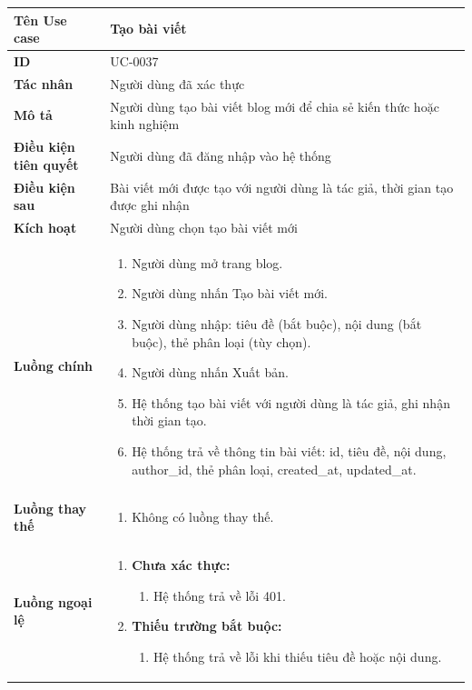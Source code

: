{
\renewcommand{\arraystretch}{1.5}

\begin{tabularx}{\textwidth}{|>{\raggedright\arraybackslash}X|>{\raggedright\arraybackslash}X|}
\hline
\textbf{Tên Use case} & Tạo bài viết \\
\hline
\textbf{ID} & UC-0037 \\
\hline
\textbf{Tác nhân} & Người dùng đã xác thực \\
\hline
\textbf{Mô tả} & Người dùng tạo bài viết blog mới để chia sẻ kiến thức hoặc kinh nghiệm \\
\hline
\textbf{Điều kiện tiên quyết} & Người dùng đã đăng nhập vào hệ thống \\
\hline
\textbf{Điều kiện sau} & Bài viết mới được tạo với người dùng là tác giả, thời gian tạo được ghi nhận \\
\hline
\textbf{Kích hoạt} & Người dùng chọn tạo bài viết mới \\
\hline
\textbf{Luồng chính} &
\begin{enumerate}
    \item Người dùng mở trang blog.
    \item Người dùng nhấn Tạo bài viết mới.
    \item Người dùng nhập: tiêu đề (bắt buộc), nội dung (bắt buộc), thẻ phân loại (tùy chọn).
    \item Người dùng nhấn Xuất bản.
    \item Hệ thống tạo bài viết với người dùng là tác giả, ghi nhận thời gian tạo.
    \item Hệ thống trả về thông tin bài viết: id, tiêu đề, nội dung, author\_id, thẻ phân loại, created\_at, updated\_at.
\end{enumerate} \\
\hline
\textbf{Luồng thay thế} &
\begin{enumerate}
    \item Không có luồng thay thế.
\end{enumerate} \\
\hline
\textbf{Luồng ngoại lệ} &
\begin{enumerate}
    \item \textbf{Chưa xác thực:}
    \begin{enumerate}
        \item[2Err.] Hệ thống trả về lỗi 401.
    \end{enumerate}
    \item \textbf{Thiếu trường bắt buộc:}
    \begin{enumerate}
        \item[5Err.] Hệ thống trả về lỗi khi thiếu tiêu đề hoặc nội dung.
    \end{enumerate}
\end{enumerate} \\
\hline
\end{tabularx}
}

